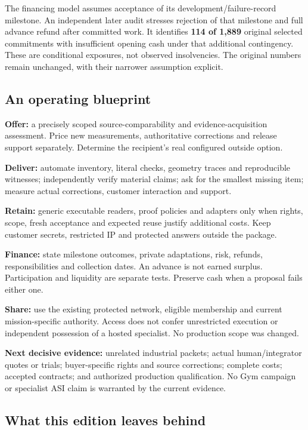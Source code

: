 \documentclass[
  10pt,
]{article}
\let\OriginalSubsection\subsection
\renewcommand{\subsection}{\needspace{6\baselineskip}\OriginalSubsection}
\begin{document}
The financing model assumes acceptance of its development/failure-record
milestone. An independent later audit stresses rejection of that
milestone and full advance refund after committed work. It identifies
\textbf{114 of 1,889} original selected commitments with insufficient
opening cash under that additional contingency. These are conditional
exposures, not observed insolvencies. The original numbers remain
unchanged, with their narrower assumption explicit.

\hypertarget{an-operating-blueprint}{%
\subsection{An operating blueprint}\label{an-operating-blueprint}}

\textbf{Offer:} a precisely scoped source-comparability and
evidence-acquisition assessment. Price new measurements, authoritative
corrections and release support separately. Determine the recipient's
real configured outside option.

\textbf{Deliver:} automate inventory, literal checks, geometry traces
and reproducible witnesses; independently verify material claims; ask
for the smallest missing item; measure actual corrections, customer
interaction and support.

\textbf{Retain:} generic executable readers, proof policies and adapters
only when rights, scope, fresh acceptance and expected reuse justify
additional costs. Keep customer secrets, restricted IP and protected
answers outside the package.

\textbf{Finance:} state milestone outcomes, private adaptations, risk,
refunds, responsibilities and collection dates. An advance is not earned
surplus. Participation and liquidity are separate tests. Preserve cash
when a proposal fails either one.

\textbf{Share:} use the existing protected network, eligible membership
and current mission-specific authority. Access does not confer
unrestricted execution or independent possession of a hosted specialist.
No production scope was changed.

\textbf{Next decisive evidence:} unrelated industrial packets; actual
human/integrator quotes or trials; buyer-specific rights and source
corrections; complete costs; accepted contracts; and authorized
production qualification. No Gym campaign or specialist ASI claim is
warranted by the current evidence.

\hypertarget{what-this-edition-leaves-behind}{%
\subsection{What this edition leaves
behind}\label{what-this-edition-leaves-behind}}
\end{document}
